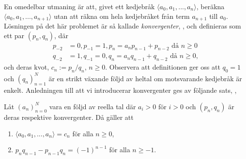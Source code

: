 En omedelbar utmaning är att, givet ett kedjebråk \(\langle a_0, a_1, ..., a_n \rangle \), beräkna \(\langle a_0, a_1, ..., a_{n+1} \rangle \) utan att räkna om hela kedjebråket från term \(a_{n+1}\) till \(a_0\). Lösningen på det här problemet är så kallade \textit{konvergenter}, \cite[Definition 20.4]{Lindahl}, och definieras som ett par \((p_n,q_n)\), där
\begin{align*}
    p_{-2} &= 0, p_{-1} = 1, p_n = a_n p_{n-1} + p_{n-2} \text{ då } n \geq 0 \\
    q_{-2} &= 1, q_{-1} = 0, q_n = a_n q_{n-1} + q_{n-2} \text{ då } n \geq 0,
\end{align*}
och deras kvot, \(c_n := p_n / q_n\), \(n \geq 0\). Observera att definitionen ger oss att \(q_0 = 1\) och \((q_n)_{n=1}^{N}\) är en strikt växande följd av heltal om motsvarande kedjebråk är enkelt. Anledningen till att vi introducerar konvergenter ges av följande sats, \cite[Sats 20.5i) och ii)]{Lindahl},
\begin{theorem} \label{app.konvergenter}
    Låt \((a_n)_{n=0}^{N}\) vara en följd av reella tal där \(a_i > 0\) för \(i > 0\) och \((p_n, q_n)\) är deras respektive konvergenter. Då gäller att
    \begin{enumerate}
        \item \(\langle a_0, a_1, ..., a_n \rangle = c_n\) för alla \(n \geq 0\),
        \item \(p_n q_{n-1} - p_{n-1} q_n = (-1)^{n-1}\) för alla \(n \geq -1\).
    \end{enumerate}
\end{theorem}
